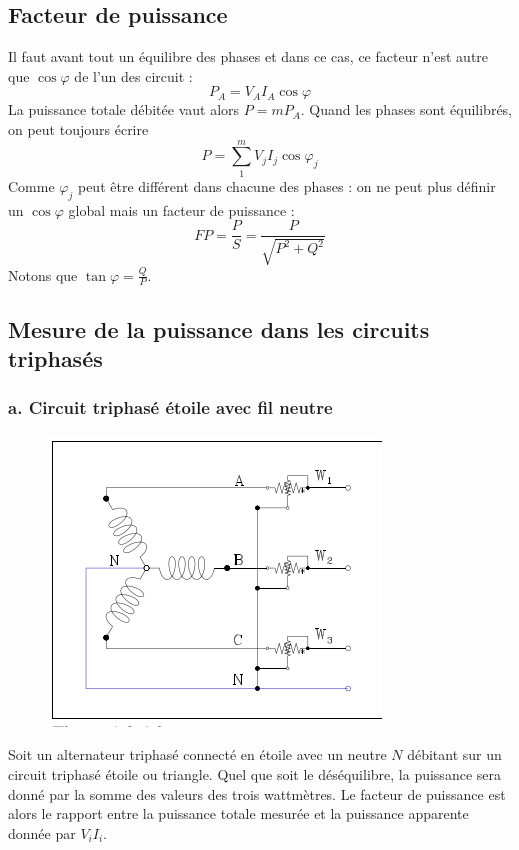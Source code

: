 \subsection{Facteur de puissance}
Il faut avant tout un équilibre des phases et dans ce cas, ce facteur n'est 
autre que $\cos\varphi$ de l'un des circuit : 
\begin{equation}
	P_A = V_AI_A\cos\varphi
\end{equation}
La puissance totale débitée vaut alors $P = mP_A$. Quand les phases sont 
équilibrés, on peut toujours écrire
\begin{equation}
	P = \sum_1^m V_jI_j\cos\varphi_j
\end{equation}
Comme $\varphi_j$ peut être différent dans chacune des phases : on ne peut 
plus définir un $\cos\varphi$ global mais un facteur de puissance :
\begin{equation}
	FP = \frac{P}{S} = \frac{P}{\sqrt{P^2+Q^2}}
\end{equation}
Notons que $\tan\varphi = \frac{Q}{P}$.
	
\subsection{Mesure de la puissance dans les circuits triphasés}
\subsubsection{a. Circuit triphasé étoile avec fil neutre}
\begin{figure}
	\vspace{-5mm}
	\includegraphics[scale=0.35]{ch1/image12.png}
\end{figure}

Soit un alternateur triphasé connecté en étoile avec un neutre $N$ 
débitant sur un circuit triphasé étoile ou triangle. Quel que soit 
le déséquilibre, la puissance sera donné par la somme des valeurs 
des trois wattmètres. Le facteur de puissance est alors le rapport 
entre la puissance totale mesurée et la puissance apparente donnée 
par $V_iI_i$.\\
\\	
